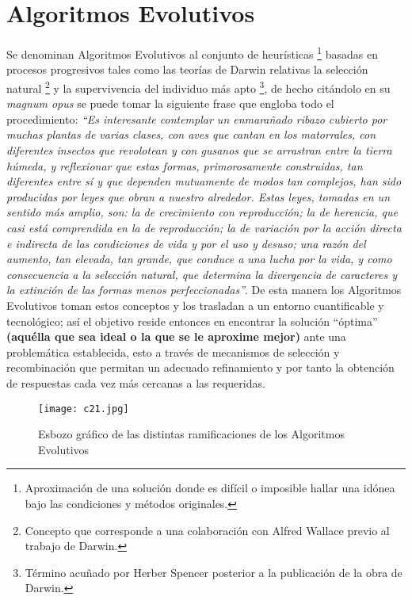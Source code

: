 \documentclass[class=report, crop=false]{standalone}
\begin{document}
\section{Algoritmos Evolutivos}
Se denominan Algoritmos Evolutivos al conjunto de heurísticas 
\footnote{Aproximación de una solución donde es difícil o imposible 
hallar una idónea bajo las condiciones y métodos originales.} 
basadas en procesos progresivos tales como las teorías de Darwin 
relativas la selección natural \footnote{Concepto que corresponde 
a una colaboración con Alfred Wallace previo al trabajo de Darwin.} 
y la supervivencia del individuo más apto \footnote{Término acuñado 
por Herber Spencer posterior a la publicación de la obra de Darwin.}, 
de hecho citándolo en su \textit{magnum opus} \cite{b1} se puede 
tomar la siguiente frase que engloba todo el procedimiento:\medskip\break
\textit{``Es interesante contemplar un enmarañado ribazo cubierto 
por muchas plantas de varias clases, con aves que cantan en los 
matorrales, con diferentes insectos que revolotean y con gusanos 
que se arrastran entre la tierra húmeda, y reflexionar que estas 
formas, primorosamente construidas, tan diferentes entre sí y que 
dependen mutuamente de modos tan complejos, han sido producidas 
por leyes que obran a nuestro alrededor.\medskip\break
Estas leyes, tomadas en un sentido más amplio, son: la de crecimiento 
con reproducción; la de herencia, que casi está comprendida en la 
de reproducción; la de variación por la acción directa e indirecta 
de las condiciones de vida y por el uso y desuso; una razón del 
aumento, tan elevada, tan grande, que conduce a una lucha por la 
vida, y como consecuencia a la selección natural, que determina 
la divergencia de caracteres y la extinción de las formas menos 
perfeccionadas''}.\medskip\break
De esta manera los Algoritmos Evolutivos toman estos conceptos y 
los trasladan a un entorno cuantificable y tecnológico; así el 
objetivo reside entonces en encontrar la solución ``óptima'' \textbf{(aquélla 
que sea ideal o la que se le aproxime mejor)} ante una problemática 
establecida, esto a través de mecanismos de selección y recombinación 
que permitan un adecuado refinamiento y por tanto la obtención 
de respuestas cada vez más cercanas a las requeridas.\medskip
\begin{figure}[ht]
\label{sec:c2_1}
\centering
\texttt{[image: c21.jpg]}
\caption{Esbozo gráfico de las distintas ramificaciones de los Algoritmos Evolutivos}
\end{figure}\break
\end{document}
